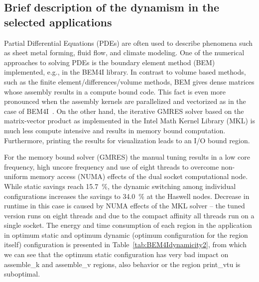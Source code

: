 \subsection{Brief description of the dynamism in the selected applications}
Partial Differential Equations (PDEs) are often used to describe phenomena such as sheet metal forming, fluid flow, and climate modeling. One of the numerical approaches to solving PDEs is the boundary element method (BEM) implemented, e.g., in the BEM4I library. In contrast to volume based methods, such as the finite element/differences/volume methods, BEM gives dense matrices whose assembly results in a compute bound code. This fact is even more pronounced when the assembly kernels are parallelized and vectorized as in the case of BEM4I~\cite{ch6_ZapMerMal2016,ch6_MerZapJar2016}. On the other hand, the iterative GMRES solver based on the matrix-vector product as implemented in the Intel Math Kernel Library (MKL) is much less compute intensive and results in memory bound computation. Furthermore, printing the results for visualization leads to an I/O bound region. 

For the memory bound solver (GMRES) the manual tuning results in a low core frequency, high uncore frequency and use of eight threads to overcome non-uniform memory access (NUMA) effects of the dual socket computational node. While static savings reach 15.7~\%, the dynamic switching among individual configurations increases the savings to 34.0~\% at the Haswell nodes. Decrease in runtime in this case is caused by NUMA effects of the MKL solver -- the tuned version runs on eight threads and due to the compact affinity all threads run on a single socket.
The energy and time consumption of each region in the application in optimum static and optimum dynamic (optimum configuration for the region itself) configuration is presented in Table~\ref{tab:BEM4Idynamicity2}, from which we can see that the optimum static configuration has very bad impact on assemble\_k and assemble\_v regions, also behavior or the region print\_vtu is suboptimal.


